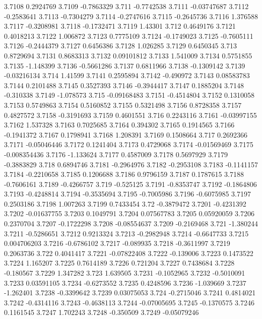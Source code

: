 3.7108  0.2924769
3.7109  -0.7863329
3.711  -0.7742538
3.7111  -0.03747687
3.7112  -0.2583641
3.7113  -0.7304279
3.7114  -0.2747616
3.7115  -0.2645736
3.7116  1.376588
3.7117  -0.3208981
3.7118  -0.1732471
3.7119  1.43301
3.712  0.4649176
3.7121  0.4018213
3.7122  1.006872
3.7123  0.7775109
3.7124  -0.1749023
3.7125  -0.7605111
3.7126  -0.2444379
3.7127  0.6456386
3.7128  1.026285
3.7129  0.6450345
3.713  0.8729694
3.7131  0.8683313
3.7132  0.09101812
3.7133  1.541009
3.7134  0.5751855
3.7135  -1.148399
3.7136  -0.5661286
3.7137  0.6811966
3.7138  -0.1309142
3.7139  -0.03216134
3.714  1.41599
3.7141  0.2595894
3.7142  -0.490972
3.7143  0.08583783
3.7144  0.2101488
3.7145  0.3527393
3.7146  -0.3944417
3.7147  0.1885204
3.7148  -0.310338
3.7149  -1.078573
3.715  -0.09168483
3.7151  -0.4514804
3.7152  0.1310058
3.7153  0.5749863
3.7154  0.5160852
3.7155  0.5321498
3.7156  0.8728358
3.7157  0.4827572
3.7158  -0.3191693
3.7159  0.4601551
3.716  0.2243116
3.7161  -0.03997155
3.7162  1.537328
3.7163  0.7025685
3.7164  0.394302
3.7165  0.1914565
3.7166  -0.1941372
3.7167  0.1798941
3.7168  1.208391
3.7169  0.1508664
3.717  0.2692366
3.7171  -0.05046446
3.7172  0.1241404
3.7173  0.4729068
3.7174  -0.01569469
3.7175  -0.008354436
3.7176  -1.133624
3.7177  0.4587009
3.7178  0.5697929
3.7179  -0.3883829
3.718  0.6894746
3.7181  -0.2964976
3.7182  -0.2953108
3.7183  -0.1141157
3.7184  -0.2210658
3.7185  0.1206688
3.7186  0.9796159
3.7187  0.1787615
3.7188  -0.7606161
3.7189  -0.4266757
3.719  -0.525125
3.7191  -0.8353747
3.7192  -0.1864806
3.7193  -0.4248814
3.7194  -0.3535694
3.7195  -0.7005986
3.7196  -0.6075985
3.7197  0.2503186
3.7198  1.007263
3.7199  0.7433454
3.72  -0.3879472
3.7201  -0.4231392
3.7202  -0.01637755
3.7203  0.1049791
3.7204  0.07567783
3.7205  0.05920059
3.7206  0.2370704
3.7207  -0.1722298
3.7208  -0.08554637
3.7209  -0.2169468
3.721  -1.380244
3.7211  -0.5286651
3.7212  0.9213324
3.7213  -0.2982948
3.7214  -0.6647733
3.7215  0.004706203
3.7216  -0.6786102
3.7217  -0.089935
3.7218  -0.3611997
3.7219  0.2063736
3.722  0.4041417
3.7221  -0.07822408
3.7222  -0.139006
3.7223  0.1473522
3.7224  1.165207
3.7225  0.7614189
3.7226  0.721204
3.7227  0.7438684
3.7228  -0.180567
3.7229  1.347282
3.723  1.639505
3.7231  -0.1052965
3.7232  -0.5010091
3.7233  0.03591105
3.7234  -0.6273552
3.7235  0.4248596
3.7236  -1.039669
3.7237  -1.262401
3.7238  -0.3399642
3.7239  0.03075053
3.724  -0.2715046
3.7241  0.4814021
3.7242  -0.4314116
3.7243  -0.4638113
3.7244  -0.07005695
3.7245  -0.1370575
3.7246  0.1161545
3.7247  1.702243
3.7248  -0.350509
3.7249  -0.05079246
